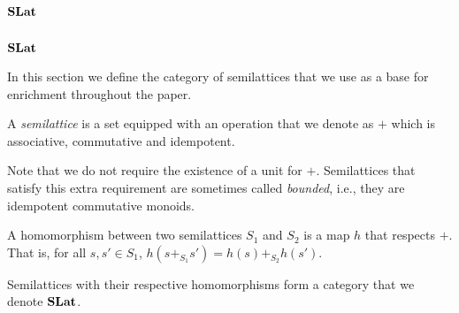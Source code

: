 \ifdefined\ONECOLUMN
\section{$\mathbf{SLat}$}
\else
\subsection{$\mathbf{SLat}$}
\fi
\label{sec:appendix:slat}

In this section we define the category of semilattices that we use as a base for enrichment throughout the paper.

\begin{definition}[Semilattice]
    A \textit{semilattice} is a set equipped with an operation that we denote as $+$ which is associative, commutative and idempotent.
  \end{definition}
  
  Note that we do not require the existence of a unit for $+$. 
  Semilattices that satisfy this extra requirement are sometimes called \textit{bounded}, i.e., they are idempotent commutative monoids.
  
  \begin{definition}
  
  A homomorphism between two semilattices $S_{1}$ and $S_{2}$ is a map $h$ that respects $+$.
  That is, for all $s,s' \in S_{1}$, $h(s +_{S_{1}} s') = h(s) +_{S_{2}} h(s')$.
  \end{definition}
  
  \begin{definition}
    
  Semilattices with their respective homomorphisms form a category that we denote $\mathbf{SLat}$.
  \end{definition}
  
